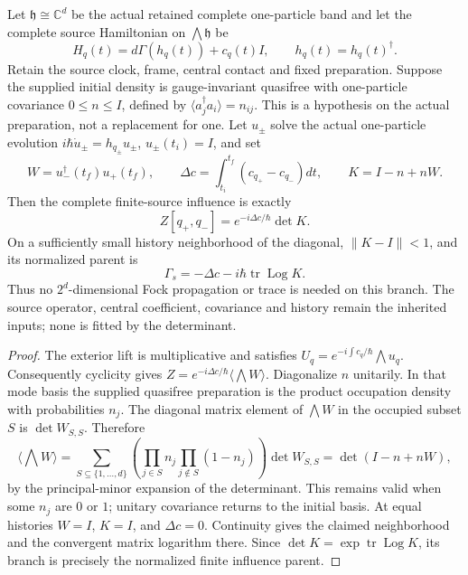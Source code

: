 \documentclass[12pt,a4paper]{article}
\begin{document}
\begin{theorem}
\label{p3f:thm:v247-car-influence-determinant}
Let $\mathfrak h\cong\mathbb C^d$ be the actual retained complete one-particle
band and let the complete source Hamiltonian on $\bigwedge\mathfrak h$ be
\[
 H_q(t)=d\Gamma(h_q(t))+c_q(t)I,\qquad h_q(t)=h_q(t)^\dagger.
\]
Retain the source clock, frame, central contact and fixed preparation.
Suppose the supplied initial density is gauge-invariant quasifree with
one-particle covariance $0\le n\le I$, defined by
$\langle a_j^\dagger a_i\rangle=n_{ij}$. This is a hypothesis on the actual
preparation, not a replacement for one. Let $u_\pm$ solve the actual
one-particle evolution $i\hbar\dot u_\pm=h_{q_\pm}u_\pm$,
$u_\pm(t_i)=I$, and set
\[
 W=u_-^\dagger(t_f)u_+(t_f),\qquad
 \Delta c=\int_{t_i}^{t_f}(c_{q_+}-c_{q_-})dt,\qquad
 K=I-n+nW.
\]
Then the complete finite-source influence is exactly
\begin{equation}
 \boxed{Z[q_+,q_-]=e^{-i\Delta c/\hbar}\det K.}
 \label{p3f:eq:v247-car-influence-determinant}
\end{equation}
On a sufficiently small history neighborhood of the diagonal,
$\|K-I\|<1$, and its normalized parent is
\[
 \boxed{\Gamma_s=-\Delta c-i\hbar\operatorname{tr}\operatorname{Log} K.}
\]
Thus no $2^d$-dimensional Fock propagation or trace is needed on this
branch. The source operator, central coefficient, covariance and history
remain the inherited inputs; none is fitted by the determinant.
\end{theorem}
\begin{proof}
The exterior lift is multiplicative and satisfies
$U_q=e^{-i\int c_q/\hbar}\bigwedge u_q$. Consequently cyclicity gives
$Z=e^{-i\Delta c/\hbar}\langle\bigwedge W\rangle$.
Diagonalize $n$ unitarily. In that mode basis the supplied quasifree
preparation is the product occupation density with probabilities $n_j$.
The diagonal matrix element of $\bigwedge W$ in the occupied subset $S$
is $\det W_{S,S}$. Therefore
\[
 \langle\bigwedge W\rangle
 =\sum_{S\subseteq\{1,\ldots,d\}}
 \left(\prod_{j\in S}n_j\prod_{j\notin S}(1-n_j)\right)\det W_{S,S}
 =\det(I-n+nW),
\]
by the principal-minor expansion of the determinant. This remains valid
when some $n_j$ are $0$ or $1$; unitary covariance returns to the initial
basis. At equal histories $W=I$, $K=I$, and $\Delta c=0$.
Continuity gives the claimed neighborhood and the convergent matrix
logarithm there. Since $\det K=\exp\operatorname{tr}\operatorname{Log} K$, its branch
is precisely the normalized finite influence parent.
\end{proof}
\end{document}
